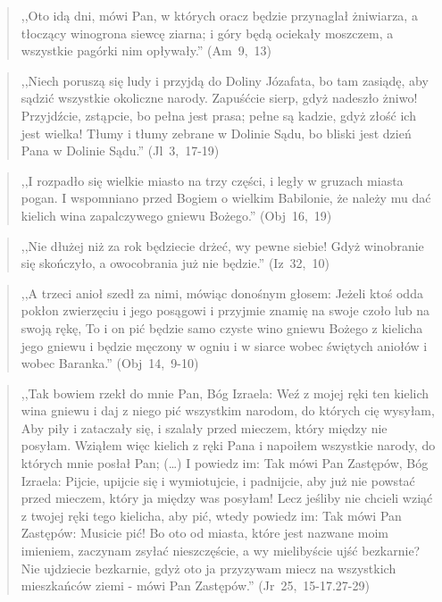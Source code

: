 \documentclass[10pt,a4paper,oneside]{article}
\begin{document}
\begin{quote}
,,Oto idą dni, mówi Pan, w których oracz będzie przynaglał żniwiarza, a tłoczący winogrona siewcę ziarna; i góry będą ociekały moszczem, a wszystkie pagórki nim opływały.'' \mbox{(Am 9, 13)}
\end{quote}
\begin{quote}
,,Niech poruszą się ludy i przyjdą do Doliny Józafata, bo tam zasiądę, aby sądzić wszystkie okoliczne narody. Zapuśćcie sierp, gdyż nadeszło żniwo! Przyjdźcie, zstąpcie, bo pełna jest prasa; pełne są kadzie, gdyż złość ich jest wielka! Tłumy i tłumy zebrane w Dolinie Sądu, bo bliski jest dzień Pana w Dolinie Sądu.'' \mbox{(Jl 3, 17-19)}
\end{quote}
\begin{quote}
,,I rozpadło się wielkie miasto na trzy części, i legły w gruzach miasta pogan. I wspomniano przed Bogiem o wielkim Babilonie, że należy mu dać kielich wina zapalczywego gniewu Bożego.'' \mbox{(Obj 16, 19)}
\end{quote}
\begin{quote}
,,Nie dłużej niż za rok będziecie drżeć, wy pewne siebie! Gdyż winobranie się skończyło, a owocobrania już nie będzie.'' \mbox{(Iz 32, 10)}
\end{quote}
\begin{quote}
,,A trzeci anioł szedł za nimi, mówiąc donośnym głosem: Jeżeli ktoś odda pokłon zwierzęciu i jego posągowi i przyjmie znamię na swoje czoło lub na swoją rękę, To i on pić będzie samo czyste wino gniewu Bożego z kielicha jego gniewu i będzie męczony w ogniu i w siarce wobec świętych aniołów i wobec Baranka.'' \mbox{(Obj 14, 9-10)}
\end{quote}
\begin{quote}
,,Tak bowiem rzekł do mnie Pan, Bóg Izraela: Weź z mojej ręki ten kielich wina gniewu i daj z niego pić wszystkim narodom, do których cię wysyłam, Aby piły i zataczały się, i szalały przed mieczem, który między nie posyłam. Wziąłem więc kielich z ręki Pana i napoiłem wszystkie narody, do których mnie posłał Pan; (\ldots) I powiedz im: Tak mówi Pan Zastępów, Bóg Izraela: Pijcie, upijcie się i wymiotujcie, i padnijcie, aby już nie powstać przed mieczem, który ja między was posyłam! Lecz jeśliby nie chcieli wziąć z twojej ręki tego kielicha, aby pić, wtedy powiedz im: Tak mówi Pan Zastępów: Musicie pić! Bo oto od miasta, które jest nazwane moim imieniem, zaczynam zsyłać nieszczęście, a wy mielibyście ujść bezkarnie? Nie ujdziecie bezkarnie, gdyż oto ja przyzywam miecz na wszystkich mieszkańców ziemi - mówi Pan Zastępów.'' \mbox{(Jr 25, 15-17.27-29)}
\end{quote}
\end{document}
